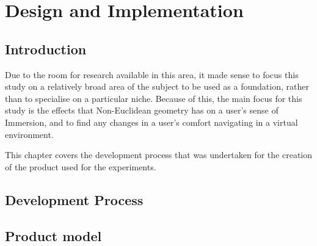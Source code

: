 \chapter[Product]{Design and Implementation}
\label{design}

	\section{Introduction}
	\label{design:intro}

		Due to the room for research available in this area, it made sense to focus this study on a relatively broad area of the subject to be used as a foundation, rather than to specialise on a particular niche.
		Because of this, the main focus for this study is the effects that Non-Euclidean geometry has on a user's sense of Immersion, and to find any changes in a user's comfort navigating in a virtual environment.

		This chapter covers the development process that was undertaken for the creation of the product used for the experiments.

	\section{Development Process}
	\label{design:dev}






	\section{Product model}
	\label{design:model}

